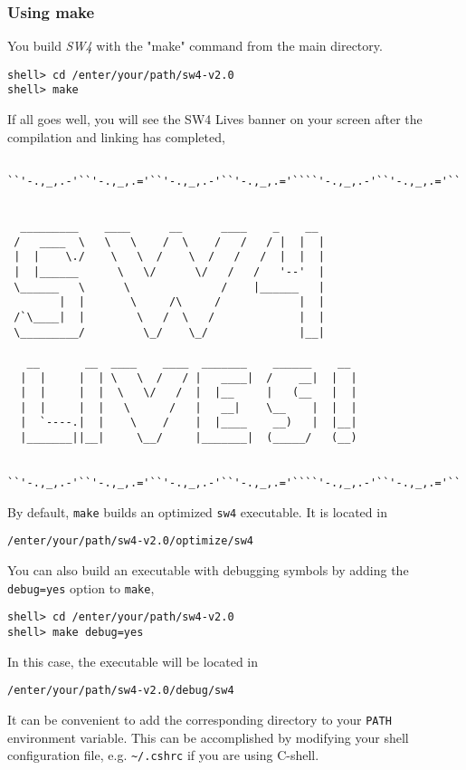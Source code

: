 \documentclass[11pt]{article}
\begin{document}
\subsubsection{Using make}
You build \emph{SW4} with the "make" command from the main directory.
\begin{verbatim}
shell> cd /enter/your/path/sw4-v2.0
shell> make
\end{verbatim}
If all goes well, you will see the SW4 Lives banner on your screen after the compilation and linking
has completed,
{\samepage
\begin{verbatim}
    
``'-.,_,.-'``'-.,_,.='``'-.,_,.-'``'-.,_,.='````'-.,_,.-'``'-.,_,.='``


  _________    ____      __      ____    _    __
 /   ____  \   \   \    /  \    /   /   / |  |  |  
 |  |    \./    \   \  /    \  /   /   /  |  |  |
 |  |______      \   \/      \/   /   /   '--'  |
 \______   \      \              /    |______   |
        |  |       \     /\     /            |  |      
 /`\____|  |        \   /  \   /             |  |      
 \_________/         \_/    \_/              |__|      
                                       
   __       __  ____    ____  _______    ______    __  
  |  |     |  | \   \  /   / |   ____|  /    __|  |  | 
  |  |     |  |  \   \/   /  |  |__     |   (__   |  | 
  |  |     |  |   \      /   |   __|    \__    |  |  | 
  |  `----.|  |    \    /    |  |____    __)   |  |__| 
  |_______||__|     \__/     |_______|  (_____/   (__)
     

``'-.,_,.-'``'-.,_,.='``'-.,_,.-'``'-.,_,.='````'-.,_,.-'``'-.,_,.='``

\end{verbatim}
}
By default, \verb+make+ builds an optimized \verb+sw4+ executable. It is located in 
\begin{verbatim}
/enter/your/path/sw4-v2.0/optimize/sw4
\end{verbatim}
You can also build an executable with debugging symbols by adding the \verb+debug=yes+ option to \verb+make+,
\begin{verbatim}
shell> cd /enter/your/path/sw4-v2.0
shell> make debug=yes
\end{verbatim}
In this case, the executable will be located in
\begin{verbatim}
/enter/your/path/sw4-v2.0/debug/sw4
\end{verbatim}
It can be convenient to add the corresponding directory to your \verb+PATH+ environment
variable. This can be accomplished by modifying your shell configuration file, e.g. \verb+~/.cshrc+
if you are using C-shell.
\end{document}

